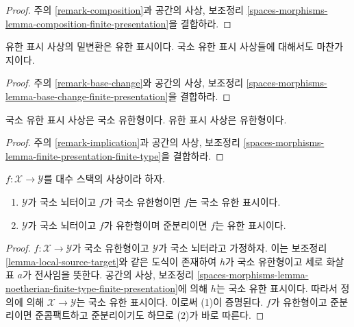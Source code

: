 \begin{proof}
주의 \ref{remark-composition}과 공간의 사상, 보조정리
\ref{spaces-morphisms-lemma-composition-finite-presentation}을 결합하라.
\end{proof}

\begin{lemma}
\label{lemma-base-change-finite-presentation}
유한 표시 사상의 밑변환은 유한 표시이다. 국소 유한 표시 사상들에
대해서도 마찬가지이다.
\end{lemma}

\begin{proof}
주의 \ref{remark-base-change}와 공간의 사상, 보조정리
\ref{spaces-morphisms-lemma-base-change-finite-presentation}을 결합하라.
\end{proof}

\begin{lemma}
\label{lemma-finite-presentation-finite-type}
국소 유한 표시 사상은 국소 유한형이다. 유한 표시 사상은 유한형이다.
\end{lemma}

\begin{proof}
주의 \ref{remark-implication}과 공간의 사상, 보조정리
\ref{spaces-morphisms-lemma-finite-presentation-finite-type}을 결합하라.
\end{proof}

\begin{lemma}
\label{lemma-noetherian-finite-type-finite-presentation}
$f : \mathcal{X} \to \mathcal{Y}$를 대수 스택의 사상이라 하자.
\begin{enumerate}
\item $\mathcal{Y}$가 국소 뇌터이고 $f$가 국소 유한형이면 $f$는 국소
유한 표시이다.
\item $\mathcal{Y}$가 국소 뇌터이고 $f$가 유한형이며 준분리이면
$f$는 유한 표시이다.
\end{enumerate}
\end{lemma}

\begin{proof}
$f : \mathcal{X} \to \mathcal{Y}$가 국소 유한형이고 $\mathcal{Y}$가
국소 뇌터라고 가정하자. 이는 보조정리
\ref{lemma-local-source-target}와 같은 도식이 존재하여 $h$가 국소
유한형이고 세로 화살표 $a$가 전사임을 뜻한다. 공간의 사상, 보조정리
\ref{spaces-morphisms-lemma-noetherian-finite-type-finite-presentation}에
의해 $h$는 국소 유한 표시이다. 따라서 정의에 의해
$\mathcal{X} \to \mathcal{Y}$는 국소 유한 표시이다. 이로써 (1)이
증명된다. $f$가 유한형이고 준분리이면 준콤팩트하고 준분리이기도
하므로 (2)가 바로 따른다.
\end{proof}

